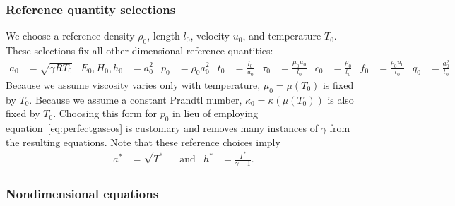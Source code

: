\documentclass[letterpaper,11pt,nointlimits,reqno]{amsart}
\begin{document}
\subsubsection{Reference quantity selections}
\label{sec:nondimrefq}

We choose a reference density $\rho_{0}$, length $l_{0}$, velocity $u_{0}$, and
temperature $T_{0}$.  These selections fix all other dimensional reference
quantities:
\begin{align}
  a_{0} &= \sqrt{\gamma{}RT_{0}}
  &
  E_{0}, H_{0}, h_{0} &= a_{0}^{2}
  &
  p_{0} &= \rho_{0} a_{0}^{2}
  &
  t_{0} &= \frac{l_{0}}{u_{0}}
  &
  \tau_{0} &= \frac{\mu_{0}u_{0}}{l_{0}}
  &
  c_{0} &= \frac{\rho_{0}}{t_{0}}
  &
  f_{0} &= \frac{\rho_{0}u_{0}}{t_{0}}
  &
  q_{0} &= \frac{a_{0}^{2}}{t_{0}}
\end{align}
Because we assume viscosity varies only with temperature, $\mu_{0}=\mu\!\left(
T_{0} \right)$ is fixed by $T_{0}$.  Because we assume a constant Prandtl
number, $\kappa_{0}=\kappa\!\left( \mu\!\left( T_{0} \right) \right)$ is also
fixed by $T_{0}$.  Choosing this form for $p_{0}$ in lieu of employing
equation~\eqref{eq:perfectgaseos} is customary and removes many instances of
$\gamma$ from the resulting equations.  Note that these reference choices imply
\begin{align}
a^{*}&=\sqrt{T^{*}}
&
&\text{and}
&
h^{*}&=\frac{T^{*}}{\gamma-1}
.
\end{align}

\subsubsection{Nondimensional equations}
\label{nondim_equations}
\end{document}
